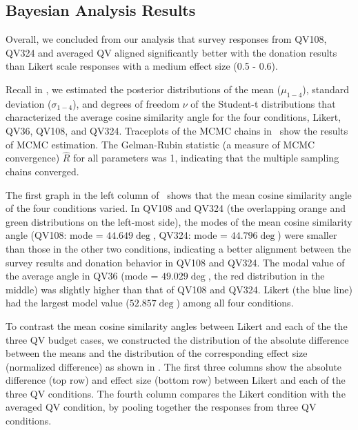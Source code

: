 \subsection{Bayesian Analysis Results}
Overall, we concluded from our analysis that survey responses from QV108, QV324 and averaged QV aligned significantly better with the donation results than Likert scale responses with a medium effect size (0.5 - 0.6). 

Recall in , we estimated the posterior distributions of the mean ($\mu_{1-4}$), standard deviation ($\sigma_{1-4}$), and degrees of freedom $\nu$ of the Student-t distributions that characterized the average cosine similarity angle for the four conditions, Likert, QV36, QV108, and QV324. Traceplots of the MCMC chains in~ show the results of MCMC estimation. The Gelman-Rubin statistic (a measure of MCMC convergence) $\hat{R}$ for all parameters was 1, indicating that the multiple sampling chains converged. 

The first graph in the left column of~ shows that the mean cosine similarity angle of the four conditions varied. In QV108 and QV324 (the overlapping orange and green distributions on the left-most side), the modes of the mean cosine similarity angle (QV108: mode = $44.649 \deg$, QV324: mode = $44.796 \deg$) were smaller than those in the other two conditions, indicating a better alignment between the survey results and donation behavior in QV108 and QV324. The modal value of the average angle in QV36 (mode = $49.029 \deg$, the red distribution in the middle) was slightly higher than that of QV108 and QV324. Likert (the blue line) had the largest model value ($52.857 \deg$) among all four conditions. 

To contrast the mean cosine similarity angles between Likert and each of the the three QV budget cases, we constructed the distribution of the absolute difference between the means and the distribution of the corresponding effect size (normalized difference) as shown in . The first three columns show the absolute difference (top row) and effect size (bottom row) between Likert and each of the three QV conditions. The fourth column compares the Likert condition with the averaged QV condition, by pooling together the responses from three QV conditions. 

